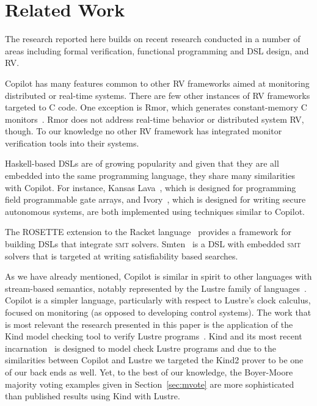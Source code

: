 \section{Related Work}\label{sec:related}
The research reported here builds on recent  research conducted in a number
of areas including formal verification, functional programming and
DSL design, and RV. 

Copilot has many features common to other RV frameworks aimed at
monitoring distributed or real-time systems.  There are few other
instances of RV frameworks targeted to C code.  One exception is {\sc
  Rmor}, which generates constant-memory C monitors~\cite{havelundc}.
{\sc Rmor} does not address real-time behavior or distributed system
RV, though.  To our knowledge no other RV framework has integrated
monitor verification tools into their systems.



Haskell-based DSLs are of growing popularity and given that they are all
embedded into the same programming language, they share many
similarities with Copilot. For instance, 
 Kansas Lava~\cite{Gill:14:DSLs}, which is designed for
programming  field programmable gate arrays,  and 
Ivory~\cite{pike-plpv14}, which is designed for writing secure autonomous
systems, are both implemented using techniques similar to Copilot.  

The ROSETTE extension to the Racket language~\cite{Torlak} provides a
framework for building DSLs that integrate \textsc{smt}
solvers. Smten~\cite{Uhler} is a DSL with embedded \textsc{smt}
solvers that is targeted at writing satisfiability based searches.


As we have already mentioned, Copilot is similar in spirit to other
languages with stream-based semantics, notably represented by the
Lustre family of languages~\cite{lustre-intro}.  Copilot is a simpler
language, particularly with respect to Lustre's clock calculus,
focused on monitoring (as opposed to developing control systems).
The work that is most
relevant the research presented in this paper is the application of
the Kind model checking tool to verify Lustre programs~\cite{Hagen08}.
Kind and its most recent incarnation~\cite{kind} is designed to model
check Lustre programs and due to the similarities between Copilot and
Lustre we targeted the Kind2 prover to be one of our back ends as
well.  Yet, to the best of our knowledge, the Boyer-Moore majority
voting examples given in Section~\ref{sec:mvote} are more
sophisticated than published results using Kind with Lustre.
  


